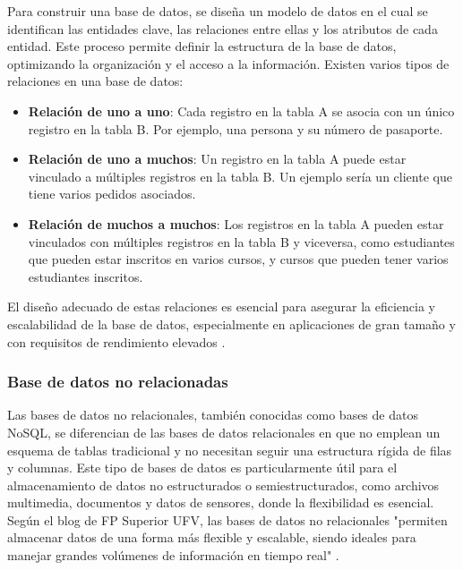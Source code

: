 Para construir una base de datos, se diseña un modelo de datos en el cual se identifican las entidades clave, las relaciones entre ellas y los atributos de cada entidad. Este proceso permite definir la estructura de la base de datos, optimizando la organización y el acceso a la información. Existen varios tipos de relaciones en una base de datos:
\begin{itemize}
    \item \textbf{Relación de uno a uno}: Cada registro en la tabla A se asocia con un único registro en la tabla B. Por ejemplo, una persona y su número de pasaporte.
    \item \textbf{Relación de uno a muchos}: Un registro en la tabla A puede estar vinculado a múltiples registros en la tabla B. Un ejemplo sería un cliente que tiene varios pedidos asociados.
    \item \textbf{Relación de muchos a muchos}: Los registros en la tabla A pueden estar vinculados con múltiples registros en la tabla B y viceversa, como estudiantes que pueden estar inscritos en varios cursos, y cursos que pueden tener varios estudiantes inscritos.
\end{itemize}

El diseño adecuado de estas relaciones es esencial para asegurar la eficiencia y escalabilidad de la base de datos, especialmente en aplicaciones de gran tamaño y con requisitos de rendimiento elevados \parencite{nutanix2023}.

\subsubsection{Base de datos no relacionadas}

Las bases de datos no relacionales, también conocidas como bases de datos NoSQL, se diferencian de las bases de datos relacionales en que no emplean un esquema de tablas tradicional y no necesitan seguir una estructura rígida de filas y columnas. Este tipo de bases de datos es particularmente útil para el almacenamiento de datos no estructurados o semiestructurados, como archivos multimedia, documentos y datos de sensores, donde la flexibilidad es esencial. Según el blog de FP Superior UFV, las bases de datos no relacionales "permiten almacenar datos de una forma más flexible y escalable, siendo ideales para manejar grandes volúmenes de información en tiempo real" \parencite{fpsuperiorufv2023}.


